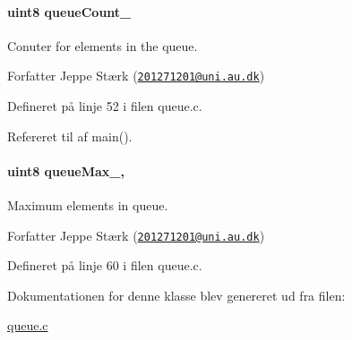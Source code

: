 \paragraph[{\texorpdfstring{queue\+Count\+\_\+}{queueCount_}}]{\setlength{\rightskip}{0pt plus 5cm}uint8 queue\+Count\+\_\+\hspace{0.3cm}{\ttfamily [private]}}\hypertarget{class_queue_ad260f9ccca00e80d161bbf3e70c3ffa6}{}\label{class_queue_ad260f9ccca00e80d161bbf3e70c3ffa6}


Conuter for elements in the queue. 

\begin{DoxyAuthor}{Forfatter}
Jeppe Stærk (\href{mailto:201271201@uni.au.dk}{\tt 201271201@uni.\+au.\+dk}) 
\end{DoxyAuthor}


Defineret på linje 52 i filen queue.\+c.



Refereret til af main().

\paragraph[{\texorpdfstring{queue\+Max\+\_\+}{queueMax_}}]{\setlength{\rightskip}{0pt plus 5cm}uint8 queue\+Max\+\_\+\hspace{0.3cm}{\ttfamily [static]}, {\ttfamily [private]}}\hypertarget{class_queue_acb6b6e88c9e4d12839594b31e6ff7c5a}{}\label{class_queue_acb6b6e88c9e4d12839594b31e6ff7c5a}


Maximum elements in queue. 

\begin{DoxyAuthor}{Forfatter}
Jeppe Stærk (\href{mailto:201271201@uni.au.dk}{\tt 201271201@uni.\+au.\+dk}) 
\end{DoxyAuthor}


Defineret på linje 60 i filen queue.\+c.



Dokumentationen for denne klasse blev genereret ud fra filen\+:\begin{DoxyCompactItemize}
\item 
\hyperlink{queue_8c}{queue.\+c}\end{DoxyCompactItemize}
